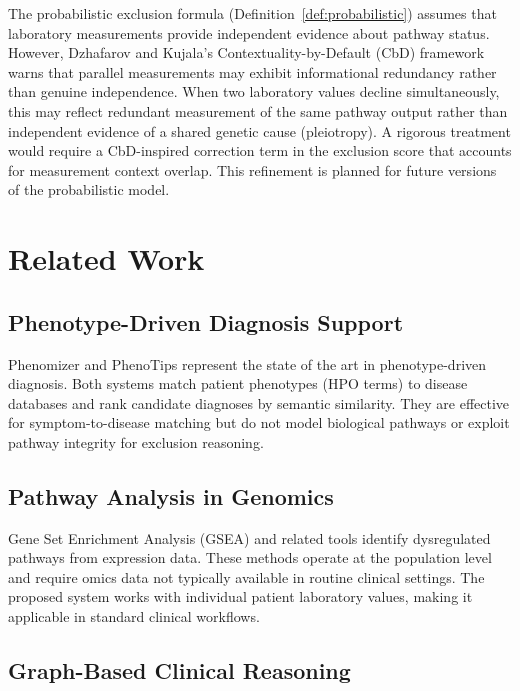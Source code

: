 \documentclass[12pt,a4paper]{article}
\begin{document}
The probabilistic exclusion formula (Definition~\ref{def:probabilistic}) assumes that laboratory measurements provide independent evidence about pathway status. However, Dzhafarov and Kujala's Contextuality-by-Default (CbD) framework \citep{Dzhafarov2016} warns that parallel measurements may exhibit informational redundancy rather than genuine independence. When two laboratory values decline simultaneously, this may reflect redundant measurement of the same pathway output rather than independent evidence of a shared genetic cause (pleiotropy). A rigorous treatment would require a CbD-inspired correction term in the exclusion score that accounts for measurement context overlap. This refinement is planned for future versions of the probabilistic model.

\section{Related Work}
\label{sec:related}

\subsection{Phenotype-Driven Diagnosis Support}

Phenomizer \citep{Kohler2009} and PhenoTips \citep{Girdea2013} represent the state of the art in phenotype-driven diagnosis. Both systems match patient phenotypes (HPO terms) to disease databases and rank candidate diagnoses by semantic similarity. They are effective for symptom-to-disease matching but do not model biological pathways or exploit pathway integrity for exclusion reasoning.

\subsection{Pathway Analysis in Genomics}

Gene Set Enrichment Analysis (GSEA) \citep{Subramanian2005} and related tools identify dysregulated pathways from expression data. These methods operate at the population level and require omics data not typically available in routine clinical settings. The proposed system works with individual patient laboratory values, making it applicable in standard clinical workflows.

\subsection{Graph-Based Clinical Reasoning}
\end{document}
